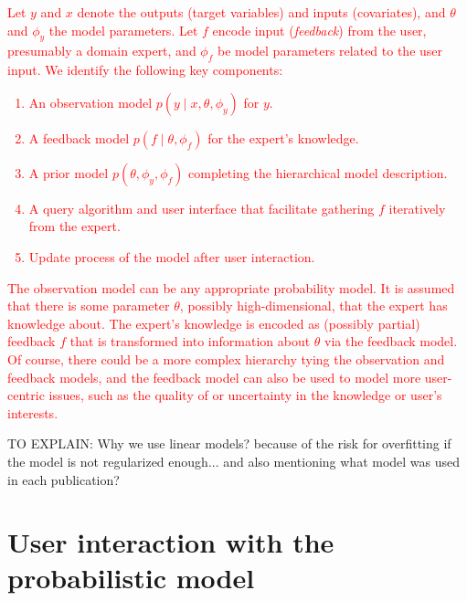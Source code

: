 \documentclass[dissertation,math,vertlayout,pdfa,colorlinks]{aaltoseries}
\begin{document}


\textcolor{red}{Let $y$ and $x$ denote the outputs (target variables) and inputs (covariates), and $\theta$ and $\phi_y$ the model parameters. Let $f$ encode input (\textit{feedback}) from the user, presumably a domain expert, and $\phi_f$ be model parameters related to the user input. We identify the following key components:
	\begin{enumerate}%
		\item An observation model $p(y\mid x,\theta,\phi_y)$ for $y$. %
		\item A feedback model $p(f\mid\theta, \phi_f)$ for the expert's knowledge. %
		\item A prior model $p(\theta, \phi_y, \phi_f)$ completing the hierarchical model description.
		\item A query algorithm and user interface that facilitate gathering $f$ iteratively from the expert.
		\item Update process of the model after user interaction.
	\end{enumerate}
	The observation model can be any appropriate probability model. It is assumed that there is some parameter $\theta$, possibly high-dimensional, that the expert has knowledge about. The expert's knowledge is encoded as (possibly partial) feedback $f$ that is transformed into information about $\theta$ via the feedback model. Of course, there could be a more complex hierarchy tying the observation and feedback models, and the feedback model can also be used to model more user-centric issues, such as the quality of or uncertainty in the knowledge or user's interests.}



TO EXPLAIN: Why we use linear models? because of the risk for overfitting if the model is not regularized enough... and also mentioning what model was used in each publication?

\chapter{User interaction with the probabilistic model}\label{interaction}
\end{document}
